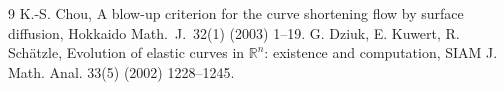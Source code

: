 \documentclass[11pt]{article}
\begin{document}
\begin{thebibliography}{9}
 K.-S. Chou, A blow-up criterion for the curve shortening flow by surface diffusion, Hokkaido Math.\ J.\ 32(1) (2003) 1--19.
 G. Dziuk, E. Kuwert, R. Sch{\"a}tzle, Evolution of elastic curves in $\mathbb R^n$: existence and computation, SIAM J. Math. Anal. 33(5) (2002) 1228--1245.
\end{thebibliography}
\end{document}
